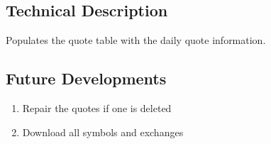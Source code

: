 \subsection{Technical Description}
Populates the quote table with the daily quote information.
\subsection{Future Developments}
\begin{enumerate}
	\item Repair the quotes if one is deleted
	\item Download all symbols and exchanges
\end{enumerate}
